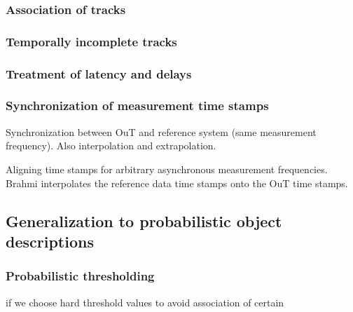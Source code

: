 \documentclass[conference]{IEEEtran}
\begin{document}
\subsubsection{Association of tracks}


\subsubsection{Temporally incomplete tracks}
\label{sec:temp_incomplete}

\subsubsection{Treatment of latency and delays}
\label{sec:temp_latency}

\subsubsection{Synchronization of measurement time stamps}
\label{sec:temp_sync}

Synchronization between OuT and reference system (same measurement frequency). 
Also interpolation and extrapolation.

Aligning time stamps for arbitrary asynchronous measurement frequencies. Brahmi \cite[Sec. 10.2.7]{Brahmi2020diss} interpolates the reference data time stamps onto the OuT time stamps.




\subsection{Generalization to probabilistic object descriptions}
\label{sec:oracle_probabilistic}


\subsubsection{Probabilistic thresholding}
\label{sec:prob_thresholding}
if we choose hard threshold values to avoid association of certain 
\end{document}

